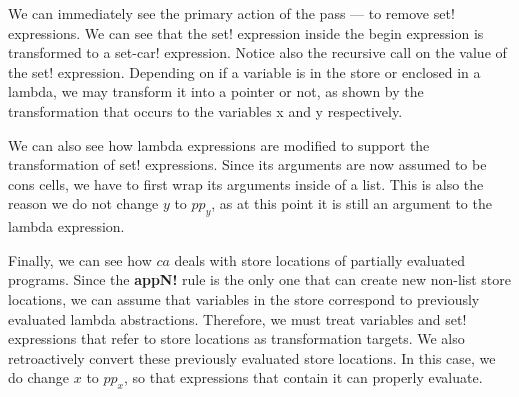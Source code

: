 We can immediately see the primary action of the pass --- to remove set! expressions. We can see that the set! expression inside the begin expression is transformed to a set-car! expression. Notice also the recursive call on the value of the set! expression. Depending on if a variable is in the store or enclosed in a lambda, we may transform it into a pointer or not, as shown by the transformation that occurs to the variables x and y respectively.

We can also see how lambda expressions are modified to support the transformation of set! expressions. Since its arguments are now assumed to be cons cells, we have to first wrap its arguments inside of a list. This is also the reason we do not change $y$ to $pp_y$, as at this point it is still an argument to the lambda expression.

Finally, we can see how $ca$ deals with store locations of partially evaluated programs. Since the \textbf{appN!} rule is the only one that can create new non-list store locations, we can assume that variables in the store correspond to previously evaluated lambda abstractions. Therefore, we must treat variables and set! expressions that refer to store locations as transformation targets. We also retroactively convert these previously evaluated store locations. In this case, we do change $x$ to $pp_x$, so that expressions that contain it can properly evaluate.



